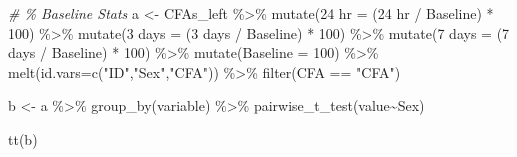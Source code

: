 \documentclass[
]{book}
\newenvironment{Shaded}{\begin{snugshade}}{\end{snugshade}}
\newcommand{\AttributeTok}[1]{\textcolor[rgb]{0.77,0.63,0.00}{#1}}
\newcommand{\CommentTok}[1]{\textcolor[rgb]{0.56,0.35,0.01}{\textit{#1}}}
\newcommand{\DecValTok}[1]{\textcolor[rgb]{0.00,0.00,0.81}{#1}}
\newcommand{\FunctionTok}[1]{\textcolor[rgb]{0.00,0.00,0.00}{#1}}
\newcommand{\NormalTok}[1]{#1}
\newcommand{\OtherTok}[1]{\textcolor[rgb]{0.56,0.35,0.01}{#1}}
\newcommand{\SpecialCharTok}[1]{\textcolor[rgb]{0.00,0.00,0.00}{#1}}
\newcommand{\StringTok}[1]{\textcolor[rgb]{0.31,0.60,0.02}{#1}}
\begin{document}
\begin{Shaded}
\begin{Highlighting}[]
\CommentTok{\# \% Baseline Stats}
\NormalTok{a }\OtherTok{\textless{}{-}}\NormalTok{ CFAs\_left }\SpecialCharTok{\%\textgreater{}\%}
  \FunctionTok{mutate}\NormalTok{(}\StringTok{\textasciigrave{}}\AttributeTok{24 hr}\StringTok{\textasciigrave{}} \OtherTok{=}\NormalTok{ (}\StringTok{\textasciigrave{}}\AttributeTok{24 hr}\StringTok{\textasciigrave{}} \SpecialCharTok{/} \StringTok{\textasciigrave{}}\AttributeTok{Baseline}\StringTok{\textasciigrave{}}\NormalTok{) }\SpecialCharTok{*} \DecValTok{100}\NormalTok{) }\SpecialCharTok{\%\textgreater{}\%}
  \FunctionTok{mutate}\NormalTok{(}\StringTok{\textasciigrave{}}\AttributeTok{3 days}\StringTok{\textasciigrave{}} \OtherTok{=}\NormalTok{ (}\StringTok{\textasciigrave{}}\AttributeTok{3 days}\StringTok{\textasciigrave{}} \SpecialCharTok{/} \StringTok{\textasciigrave{}}\AttributeTok{Baseline}\StringTok{\textasciigrave{}}\NormalTok{) }\SpecialCharTok{*} \DecValTok{100}\NormalTok{) }\SpecialCharTok{\%\textgreater{}\%}
  \FunctionTok{mutate}\NormalTok{(}\StringTok{\textasciigrave{}}\AttributeTok{7 days}\StringTok{\textasciigrave{}} \OtherTok{=}\NormalTok{ (}\StringTok{\textasciigrave{}}\AttributeTok{7 days}\StringTok{\textasciigrave{}} \SpecialCharTok{/} \StringTok{\textasciigrave{}}\AttributeTok{Baseline}\StringTok{\textasciigrave{}}\NormalTok{) }\SpecialCharTok{*} \DecValTok{100}\NormalTok{) }\SpecialCharTok{\%\textgreater{}\%}
  \FunctionTok{mutate}\NormalTok{(}\AttributeTok{Baseline =} \DecValTok{100}\NormalTok{) }\SpecialCharTok{\%\textgreater{}\%}
  \FunctionTok{melt}\NormalTok{(}\AttributeTok{id.vars=}\FunctionTok{c}\NormalTok{(}\StringTok{"ID"}\NormalTok{,}\StringTok{"Sex"}\NormalTok{,}\StringTok{"CFA"}\NormalTok{)) }\SpecialCharTok{\%\textgreater{}\%}
  \FunctionTok{filter}\NormalTok{(CFA }\SpecialCharTok{==} \StringTok{"CFA"}\NormalTok{)}

\NormalTok{b }\OtherTok{\textless{}{-}}\NormalTok{ a }\SpecialCharTok{\%\textgreater{}\%} 
  \FunctionTok{group\_by}\NormalTok{(variable) }\SpecialCharTok{\%\textgreater{}\%}
  \FunctionTok{pairwise\_t\_test}\NormalTok{(value}\SpecialCharTok{\textasciitilde{}}\NormalTok{Sex)}

\FunctionTok{tt}\NormalTok{(b)}
\end{Highlighting}
\end{Shaded}
\end{document}
